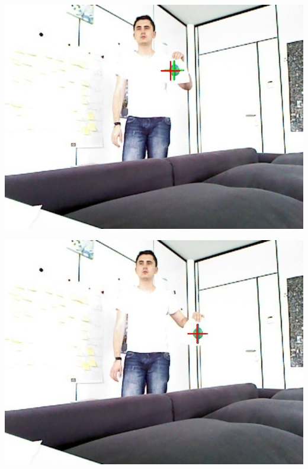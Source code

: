 \begin{center}
	\includegraphics[scale=0.6]{images/compare_output/rgb_image_3.jpg}
\end{center}

\begin{center}
	\includegraphics[scale=0.6]{images/compare_output/rgb_image_4.jpg}
\end{center}

